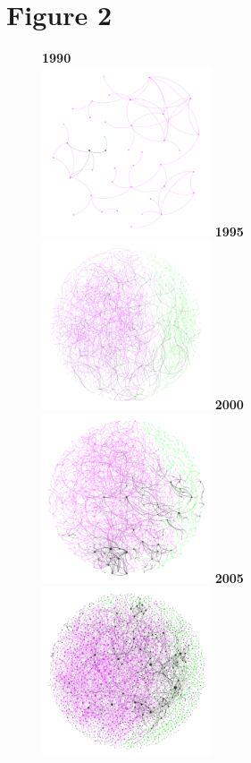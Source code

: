 \documentclass[10pt]{article}         %
\begin{document}
\section{Figure 2}
\begin{figure}[!htb]
    \textbf{1990}\\
    \includegraphics[width=5cm, height=5cm]{Fig2A1990.png}
  \endminipage\hfill
    \textbf{1995}\\
    \includegraphics[width=5cm, height=5cm]{Fig2A1995.png}
  \endminipage\hfill
    \textbf{2000}\\
    \includegraphics[width=5cm, height=5cm]{Fig2A2000.png}
  \endminipage\hfill
    \textbf{2005}\\
    \includegraphics[width=5cm, height=5cm]{Fig2A2005.png}

\end{figure}
\end{document}
